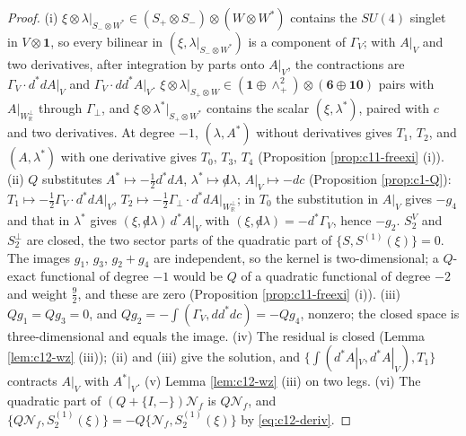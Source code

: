 \begin{proof}
(i) $\xi\otimes\lambda|_{S_-\otimes W^*}\in(S_+\otimes S_-)\otimes(W\otimes W^*)$ contains the $SU(4)$ singlet in $V\otimes\mathbf 1$, so every bilinear in $(\xi,\lambda|_{S_-\otimes W^*})$ is a component of $\Gamma_V$; with $A|_V$ and two derivatives, after integration by parts onto $A|_V$, the contractions are $\Gamma_V\cdot d^*dA|_V$ and $\Gamma_V\cdot dd^*A|_V$. $\xi\otimes\lambda|_{S_+\otimes W}\in(\mathbf 1\oplus\wedge^2_+)\otimes(\mathbf 6\oplus\mathbf{10})$ pairs with $A|_{W_{\mathbb R}^\perp}$ through $\Gamma_\perp$, and $\xi\otimes\lambda^*|_{S_+\otimes W^*}$ contains the scalar $(\xi,\lambda^*)$, paired with $c$ and two derivatives. At degree $-1$, $(\lambda,A^*)$ without derivatives gives $T_1$, $T_2$, and $(A,\lambda^*)$ with one derivative gives $T_0$, $T_3$, $T_4$ (Proposition \ref{prop:c11-freexi} (i)). (ii) $Q$ substitutes $A^*\mapsto-\tfrac12d^*dA$, $\lambda^*\mapsto{\not d}\lambda$, $A|_V\mapsto-dc$ (Proposition \ref{prop:c1-Q}): $T_1\mapsto-\tfrac12\Gamma_V\cdot d^*dA|_V$, $T_2\mapsto-\tfrac12\Gamma_\perp\cdot d^*dA|_{W_{\mathbb R}^\perp}$; in $T_0$ the substitution in $A|_V$ gives $-g_4$ and that in $\lambda^*$ gives $(\xi,{\not d}\lambda)\,d^*A|_V$ with $(\xi,{\not d}\lambda)=-d^*\Gamma_V$, hence $-g_2$. $S^V_2$ and $S^\perp_2$ are closed, the two sector parts of the quadratic part of $\{S,S^{(1)}(\xi)\}=0$. The images $g_1$, $g_3$, $g_2+g_4$ are independent, so the kernel is two-dimensional; a $Q$-exact functional of degree $-1$ would be $Q$ of a quadratic functional of degree $-2$ and weight $\tfrac92$, and these are zero (Proposition \ref{prop:c11-freexi} (i)). (iii) $Qg_1=Qg_3=0$, and $Qg_2=-\int(\Gamma_V,dd^*dc)=-Qg_4$, nonzero; the closed space is three-dimensional and equals the image. (iv) The residual is closed (Lemma \ref{lem:c12-wz} (iii)); (ii) and (iii) give the solution, and $\{\int(d^*A|_V,d^*A|_V),T_1\}$ contracts $A|_V$ with $A^*|_V$. (v) Lemma \ref{lem:c12-wz} (iii) on two legs. (vi) The quadratic part of $(Q+\{I,-\})\mathcal N_f$ is $Q\mathcal N_f$, and $\{Q\mathcal N_f,S^{(1)}_2(\xi)\}=-Q\{\mathcal N_f,S^{(1)}_2(\xi)\}$ by \eqref{eq:c12-deriv}.
\end{proof}


